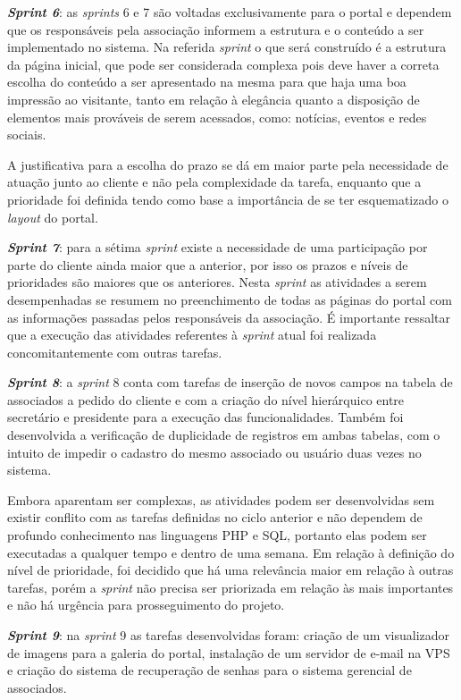 \textbf{\textit{Sprint 6}}: as \textit{sprints} 6 e 7 são voltadas exclusivamente para o portal e dependem que os responsáveis pela associação informem a estrutura e o conteúdo a ser implementado no sistema. Na referida \textit{sprint} o que será construído é a estrutura da página inicial, que pode ser considerada complexa pois deve haver a correta escolha do conteúdo a ser apresentado na mesma para que haja uma boa impressão ao visitante, tanto em relação à elegância quanto a disposição de elementos mais prováveis de serem acessados, como: notícias, eventos e redes sociais. 

A justificativa para a escolha do prazo se dá em maior parte pela necessidade de atuação junto ao cliente e não pela complexidade da tarefa, enquanto que a prioridade foi definida tendo como base a importância de se ter esquematizado o \textit{layout} do portal.

\textbf{\textit{Sprint 7}}: para a sétima \textit{sprint} existe a necessidade de uma participação por parte do cliente ainda maior que a anterior, por isso os prazos e níveis de prioridades são maiores que os anteriores. Nesta \textit{sprint} as atividades a serem desempenhadas se resumem no preenchimento de todas as páginas do portal com as informações passadas pelos responsáveis da associação. É importante ressaltar que a execução das atividades referentes à \textit{sprint} atual foi realizada concomitantemente com outras tarefas. 

\textbf{\textit{Sprint 8}}: a \textit{sprint} 8 conta com tarefas de inserção de novos campos na tabela de associados a pedido do cliente e com a criação do nível hierárquico entre secretário e presidente para a execução das funcionalidades. Também foi desenvolvida a verificação de duplicidade de registros em ambas tabelas, com o intuito de impedir o cadastro do mesmo associado ou usuário duas vezes no sistema. 

Embora aparentam ser complexas, as atividades podem ser desenvolvidas sem existir conflito com as tarefas definidas no ciclo anterior e não dependem de profundo conhecimento nas linguagens PHP e SQL, portanto elas podem ser executadas a qualquer tempo e dentro de uma semana. Em relação à definição do nível de prioridade, foi decidido que há uma relevância maior em relação à outras tarefas, porém a \textit{sprint} não precisa ser priorizada em relação às mais importantes e não há urgência para prosseguimento do projeto. 

\textbf{\textit{Sprint 9}}: na \textit{sprint} 9 as tarefas desenvolvidas foram: criação de um visualizador de imagens para a galeria do portal, instalação de um servidor de e-mail na VPS e criação do sistema de recuperação de senhas para o sistema gerencial de associados.

